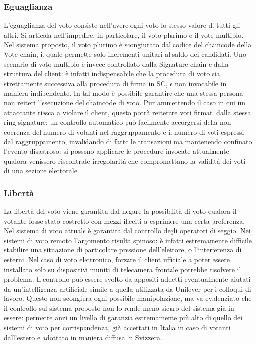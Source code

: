 		\subsubsection{Eguaglianza}
			L'eguaglianza del voto consiste nell'avere ogni voto lo stesso valore di tutti gli altri. Si articola nell'impedire, in particolare, il voto plurimo e il voto multiplo. Nel sistema proposto, il voto plurimo è scongiurato dal codice del chaincode della Vote chain, il quale permette solo incrementi unitari al saldo dei candidati. Uno scenario di voto multiplo è invece controllato dalla Signature chain e dalla struttura del client: è infatti indispensabile che la procedura di voto sia strettamente successiva alla procedura di firma in SC, e non invocabile in maniera indipendente. In tal modo è possibile garantire che una stessa persona non reiteri l'esecuzione del chaincode di voto. Pur ammettendo il caso in cui un attaccante riesca a violare il client, questo potrà reiterare voti firmati dalla stessa ring signature: un controllo automatico può facilmente accorgersi della non coerenza del numero di votanti nel raggruppamento e il numero di voti espressi dal raggruppamento, invalidando di fatto le transazioni ma mantenendo confinato l'evento disastroso: si possono applicare le procedure invocate attualmente qualora venissero riscontrate irregolarità che compromettano la validità dei voti di una sezione elettorale.
		
		\subsubsection{Libertà}\label{subsec:liberta_voto}
			La libertà del voto viene garantita dal negare la possibilità di voto qualora il votante fosse stato costretto con mezzi illeciti a esprimere una certa preferenza. Nel sistema di voto attuale è garantita dal controllo degli operatori di seggio. Nei sistemi di voto remoto l'argomento risulta spinoso: è infatti estremamente difficile stabilire una situazione di particolare pressione dell'elettore, o l'interferenza di esterni. Nel caso di voto elettronico, forzare il client ufficiale a poter essere installato solo su dispositivi muniti di telecamera frontale potrebbe risolvere il problema. Il controllo può essere svolto da appositi addetti eventualmente aiutati da un'intelligenza artificiale simile a quella utilizzata da Unilever \cite{ai_unilever} per i colloqui di lavoro. Questo non scongiura ogni possibile manipolazione, ma va evidenziato che il controllo sul sistema proposto non lo rende meno sicuro del sistema già in essere: permette anzi un livello di garanzia estremamente più alto di quello dei sistemi di voto per corrispondenza, già accettati in Italia in caso di votanti dall'estero e adottato in maniera diffusa in Svizzera.
		
